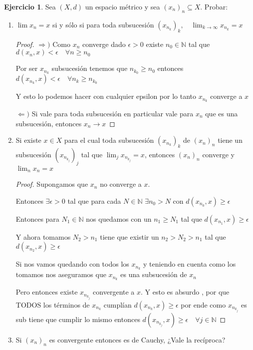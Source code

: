 \documentclass[11pt]{report}
\newcommand{\N}{\mathbb{N}}
\newcommand{\Ra}{\Rightarrow}
\newcommand{\ra}{\rightarrow}
\theoremstyle{definition}
\newtheorem{ej}{Ejercicio}
\begin{document}
\begin{ej}
	Sea $(X,d)$ un espacio métrico y sea $(x_n)_n \subseteq X$. Probar:
	\begin{enumerate}
		\item $\lim x_n = x$ si y sólo si para toda subsucesión $(x_{n_k})_k, \quad \lim_{k \ra \infty} x_{n_k} = x$
			\begin{proof}
				$\Ra )$	Como $x_n$ converge dado $\epsilon >0$ existe $n_0 \in \N$ tal que $d(x_n,x) < \epsilon \quad \forall n \geq n_0$

				Por ser $x_{n_k}$ subsucesión tenemos que $n_{k_0} \geq n_0 $ entonces $d(x_{n_k},x) < \epsilon \quad \forall n_k \geq n_{k_0}$

				Y esto lo podemos hacer con cualquier epsilon por lo tanto $x_{n_k}$ converge a $x$

				$\Leftarrow )$ Si vale para toda subsucesión en particular vale para $x_n$ que es una subsucesión, entonces $x_n \ra x$
			\end{proof}

		\item Si existe $x \in X$ para el cual toda subsucesión $(x_{n_k})_k$ de $(x_n)_n$ tiene un subsucesión $(x_{n_{k_j}})_j$ tal que $\lim_{j} x_{n_{k_j}} = x$, entonces $(x_n)_n$ converge y $\lim_n x_n = x$
			
		\begin{proof}
			Supongamos que $x_n$ no converge a $x$.

			Entonces $\exists \epsilon >0$ tal que para cada $N \in \N$ $\exists n_0 > N$ con $d(x_{n_0},x) \geq \epsilon$

			Entonces para $N_1 \in \N$ nos quedamos con un $n_1 \geq N_1$ tal que $d(x_{n_1},x) \geq \epsilon$

			Y ahora tomamos $N_2 > n_1$ tiene que existir un $n_2 > N_2 > n_1$ tal que $d(x_{n_2},x) \geq \epsilon$

			Si nos vamos quedando con todos los $x_{n_k}$ y teniendo en cuenta como los tomamos nos aseguramos que $x_{n_k}$ es una subsucesión de $x_n$

			Pero entonces existe $x_{n_{k_j}}$ convergente a $x$. Y esto es absurdo , por que TODOS los términos de $x_{n_k}$ cumplían $d(x_{n_k},x) \geq \epsilon$ por ende como $x_{n_{k_j}}$ es sub tiene que cumplir lo mismo entonces $d(x_{n_{k_j}},x) \geq \epsilon \quad \forall j \in \N$
		\end{proof}

		\item Si $(x_n)_n$ es convergente entonces es de Cauchy, ¿Vale la recíproca?


\end{enumerate}
\end{ej}
\end{document}
